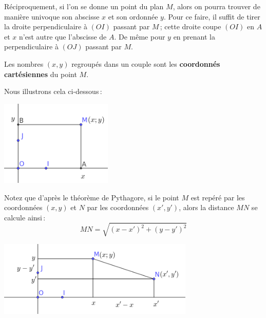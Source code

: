 		Réciproquement, si l'on se donne un point du plan $M$, alors on pourra trouver de manière univoque son abscisse $x$ et son ordonnée $y$. Pour ce faire, il suffit de tirer la droite perpendiculaire à $(OI)$ passant par $M$\,; cette droite coupe $(OI)$ en $A$ et $x$ n'est autre que l'abscisse de $A$. De même pour $y$ en prenant la perpendiculaire à $(OJ)$ passant par $M$.

		Les nombres $(x,y)$ regroupés dans un couple sont les {\bfseries coordonnés cartésiennes} du point $M$.

		Nous  illustrons cela ci-dessous\,:

		\vspace{0.2cm}

		\includegraphics[width=0.4\textwidth]{image/calcul/point2d.png}			

		Notez que d'après le théorème de Pythagore, si le point $M$ est repéré par les coordonnées $(x,y)$ et $N$ par les coordonnées $(x',y')$, alors la distance $MN$ se calcule ainsi\,:
		\begin{equation}
			MN=\sqrt{(x-x')^2+(y-y')^2}
		\end{equation}

		\includegraphics[width=0.7\textwidth]{image/calcul/point2dpyth.png}


